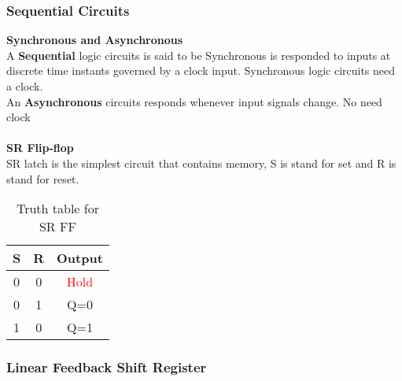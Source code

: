 \subsubsection{Sequential Circuits}
\textbf{Synchronous and Asynchronous} \\
A \textbf{Sequential} logic circuits is said to be Synchronous is responded to inputs at discrete time instants governed by a clock input. Synchronous logic circuits need a clock. \\
An \textbf{Asynchronous} circuits responds whenever input signals change. No need clock\\
\\
\textbf{SR Flip-flop} \\
SR latch is the simplest circuit that contains memory, S is stand for set and R is stand for reset.
\begin{table}[h]
    \centering
    \begin{tabular}{|c|c|c|}
    \hline
         S & R & Output  \\
         \hline
         0 & 0 & \textcolor{red}{Hold} \\
         \hline
         0 & 1 & Q=0 \\
         \hline
         1 & 0 & Q=1 \\
         \hline
    \end{tabular}
    \caption{Truth table for SR FF}
\end{table}

\subsubsection{Linear Feedback Shift Register}

